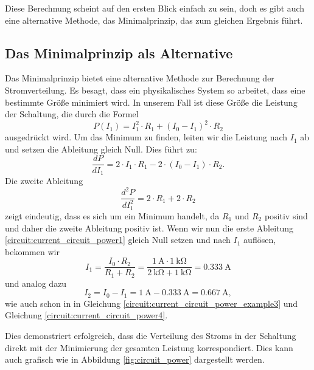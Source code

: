 Diese Berechnung scheint auf den ersten Blick einfach zu sein, doch es gibt auch eine alternative Methode, das Minimalprinzip, das zum gleichen Ergebnis führt.

\subsection{Das Minimalprinzip als Alternative} 
Das Minimalprinzip bietet eine alternative Methode zur Berechnung der Stromverteilung. Es besagt, dass ein physikalisches System so arbeitet, dass eine bestimmte Größe minimiert wird. In unserem Fall ist diese Größe die Leistung der Schaltung, die durch die Formel
\begin{equation}
	P(I_1)=  I_1^2 \cdot R_1+  (I_0-I_1)^2 \cdot R_2
	\label{circuit:current_circuit_power}
\end{equation}
ausgedrückt wird. Um das Minimum zu finden, leiten wir die Leistung nach $I_1$ ab und setzen die Ableitung gleich Null. Dies führt zu:
\begin{equation}
	\frac{dP}{dI_1} = 2\cdot I_1\cdot R_1 - 2\cdot (I_0 - I_1) \cdot R_2.
	\label{circuit:current_circuit_power1}
\end{equation}
Die zweite Ableitung 
\begin{equation}
	\frac{d^2P}{dI_1^2} = 2\cdot R_1 + 2\cdot R_2
	\label{circuit:current_circuit_power2}
\end{equation}
zeigt eindeutig, dass es sich um ein Minimum handelt, da $R_1$ und $R_2$ positiv sind und daher die zweite Ableitung positiv ist. Wenn wir nun die erste Ableitung \eqref{circuit:current_circuit_power1} gleich Null setzen und nach $I_1$ auflösen, bekommen wir
\begin{equation}
	I_1 = \frac{I_0 \cdot R_2}{R_1 + R_2} = \frac{\SI{1}{\ampere} \cdot \SI{1}{\kilo\ohm}}{\SI{2}{\kilo\ohm}+ \SI{1}{\kilo\ohm}}=\SI{0.333}{\ampere}
	\label{circuit:current_circuit_power_a}
\end{equation}
und analog dazu
\begin{equation}
	I_2 = I_0-I_1=\SI{1}{\ampere}-\SI{0.333}{\ampere}=\SI{0.667}{\ampere},
	\label{circuit:current_circuit_power_b}
\end{equation}
wie auch schon in in Gleichung \eqref{circuit:current_circuit_power_example3} und Gleichung \eqref{circuit:current_circuit_power4}.

Dies demonstriert erfolgreich, dass die Verteilung des Stroms in der Schaltung direkt mit der Minimierung der gesamten Leistung korrespondiert. Dies kann auch grafisch wie in Abbildung \ref{fig:circuit_power} dargestellt werden.

